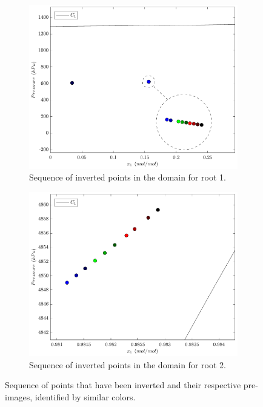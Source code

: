 \documentclass[journal=iecred,manuscript=article]{achemso}
\theoremstyle{definition}
\theoremstyle{remark}
\begin{document}
\begin{figure}[!ht]
\begin{subfigure}{.48\textwidth}
\end{subfigure}\\
\begin{subfigure}{.48\textwidth}
  \centering
  \includegraphics[width=\linewidth]{sequencia_pontos_dominio_3.pdf}
  \caption{Sequence of inverted points in the domain for root 1.}
  \label{fig:points_domain_1}
\end{subfigure}\hfill
\begin{subfigure}{.48\textwidth}
  \centering
  \includegraphics[width=\linewidth]{sequencia_pontos_dominio_2.pdf}
  \caption{Sequence of inverted points in the domain for root 2.}
  \label{fig:points_domain_2}
\end{subfigure}
\caption{Sequence of points that have been inverted and their respective pre-images, identified by similar colors.}
\label{fig:sequencia_inversao}
\end{figure}
\end{document}
